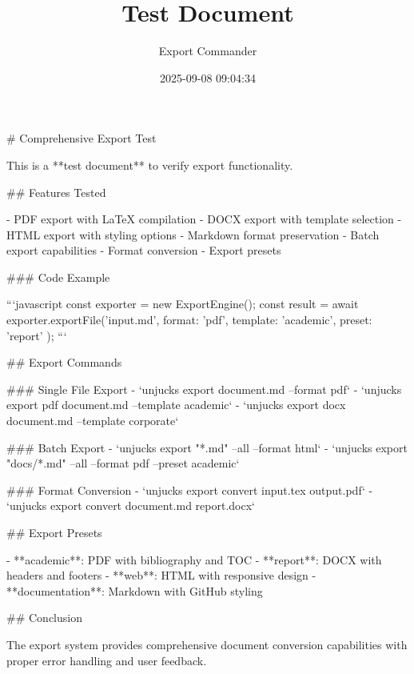 \documentclass{article}
\title{Test Document}
\author{Export Commander}
\date{2025-09-08 09:04:34}
\begin{document}
\maketitle

\tableofcontents
\newpage



\# Comprehensive Export Test

This is a **test document** to verify export functionality.

\#\# Features Tested

- PDF export with LaTeX compilation
- DOCX export with template selection  
- HTML export with styling options
- Markdown format preservation
- Batch export capabilities
- Format conversion
- Export presets

\#\#\# Code Example

```javascript
const exporter = new ExportEngine();
const result = await exporter.exportFile('input.md', {
  format: 'pdf',
  template: 'academic',
  preset: 'report'
});
```

\#\# Export Commands

\#\#\# Single File Export
- `unjucks export document.md --format pdf`
- `unjucks export pdf document.md --template academic`
- `unjucks export docx document.md --template corporate`

\#\#\# Batch Export
- `unjucks export "*.md" --all --format html`
- `unjucks export "docs/*.md" --all --format pdf --preset academic`

\#\#\# Format Conversion
- `unjucks export convert input.tex output.pdf`
- `unjucks export convert document.md report.docx`

\#\# Export Presets

- **academic**: PDF with bibliography and TOC
- **report**: DOCX with headers and footers
- **web**: HTML with responsive design
- **documentation**: Markdown with GitHub styling

\#\# Conclusion

The export system provides comprehensive document conversion capabilities with proper error handling and user feedback.
\end{document}
